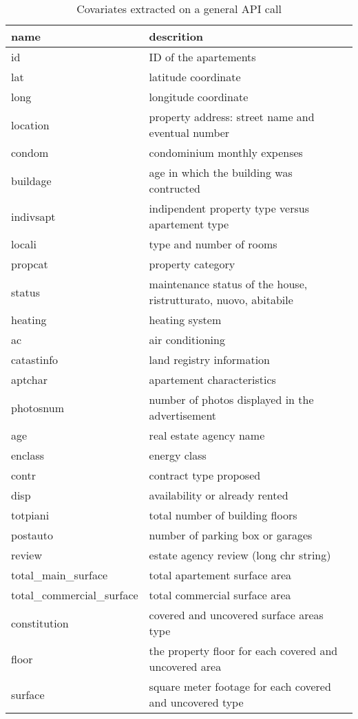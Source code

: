 \documentclass[
  12pt,
  a4paper,
  oneside]{book}
\theoremstyle{definition}
\theoremstyle{definition}
\theoremstyle{definition}
\theoremstyle{remark}
\begin{document}
\begin{longtable}[t]{ll}
\caption{\label{tab:covartable}Covariates extracted on a general API call}\\
\toprule
name & descrition\\
\midrule
id & ID of the apartements\\
lat & latitude coordinate\\
long & longitude coordinate\\
location & property address: street name and eventual number\\
condom & condominium monthly expenses\\
\addlinespace
buildage & age in which the building was contructed\\
indivsapt & indipendent property type versus apartement type\\
locali & type and number of rooms\\
propcat & property category\\
status & maintenance status of the house, ristrutturato, nuovo, abitabile\\
\addlinespace
heating & heating system\\
ac & air conditioning\\
catastinfo & land registry information\\
aptchar & apartement characteristics\\
photosnum & number of photos displayed in the advertisement\\
\addlinespace
age & real estate agency name\\
enclass & energy class\\
contr & contract type proposed\\
disp & availability or already rented\\
totpiani & total number of building floors\\
\addlinespace
postauto & number of parking box or garages\\
review & estate agency review (long chr string)\\
total\_main\_surface & total apartement surface area\\
total\_commercial\_surface & total commercial surface area\\
constitution & covered and uncovered surface areas type\\
\addlinespace
floor & the property floor for each covered and uncovered area\\
surface & square meter footage for each covered and uncovered type\\

\end{longtable}
\end{document}
